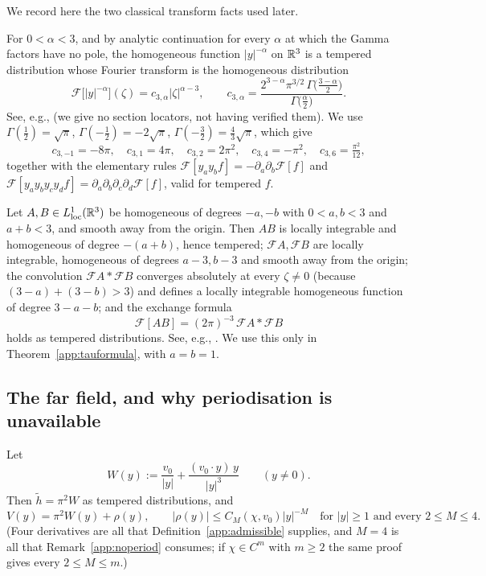 We record here the two classical transform facts used later.

\begin{remark}
\label{app:classical-riesz}
For $0<\alpha<3$, and by analytic continuation for every $\alpha$ at
which the Gamma factors have no pole, the homogeneous function
$|y|^{-\alpha}$ on $\mathbb R^3$ is a tempered distribution whose Fourier
transform is the homogeneous distribution
\[
\mathcal F\big[|y|^{-\alpha}\big](\zeta)=c_{3,\alpha}|\zeta|^{\alpha-3},
\qquad
c_{3,\alpha}=\frac{2^{3-\alpha}\pi^{3/2}\,\Gamma\!\big(\frac{3-\alpha}{2}\big)}
{\Gamma\!\big(\frac{\alpha}{2}\big)} .
\]
See, e.g., \cite{SteinWeiss,GelfandShilov,Grafakos} (we give no section
locators, not having verified them). We use
$\Gamma(\tfrac12)=\sqrt\pi$, $\Gamma(-\tfrac12)=-2\sqrt\pi$,
$\Gamma(-\tfrac32)=\tfrac43\sqrt\pi$, which give
\[
c_{3,-1}=-8\pi,\quad c_{3,1}=4\pi,\quad c_{3,2}=2\pi^2,\quad
c_{3,4}=-\pi^2,\quad c_{3,6}=\tfrac{\pi^2}{12},
\]
together with the elementary rules
$\mathcal F[y_ay_bf]=-\partial_a\partial_b\mathcal F[f]$ and
$\mathcal F[y_ay_by_cy_df]=\partial_a\partial_b\partial_c\partial_d\mathcal F[f]$,
valid for tempered $f$.
\end{remark}

\begin{remark}\label{app:classical-homog}
Let $A,B\in L^1_{\rm loc}(\mathbb R^3)$ be homogeneous of degrees $-a,-b$ with
$0<a,b<3$ and $a+b<3$, and smooth away from the origin. Then $AB$ is
locally integrable and homogeneous of degree $-(a+b)$, hence tempered;
$\mathcal FA,\mathcal FB$ are locally integrable, homogeneous of degrees
$a-3,b-3$ and smooth away from the origin; the convolution
$\mathcal FA*\mathcal FB$ converges absolutely at every $\zeta\neq0$
(because $(3-a)+(3-b)>3$) and defines a locally integrable homogeneous
function of degree $3-a-b$; and the exchange formula
\[
\mathcal F[AB]=(2\pi)^{-3}\,\mathcal FA*\mathcal FB
\]
holds as tempered distributions. See, e.g.,
\cite{GelfandShilov,Grafakos}. We use this only in
Theorem~\ref{app:tauformula}, with $a=b=1$.
\end{remark}

\subsection{The far field, and why periodisation is unavailable}
\label{app:farfield-sec}

\begin{theorem}\label{app:farfield}
Let
\[
W(y):=\frac{v_0}{|y|}+\frac{(v_0\cdot y)\,y}{|y|^3}\qquad(y\neq0).
\]
Then $\widetilde h=\pi^2W$ as tempered distributions, and
\[
V(y)=\pi^2W(y)+\rho(y),\qquad
|\rho(y)|\le C_M(\chi,v_0)|y|^{-M}\quad\text{for }|y|\ge1
\text{ and every }2\le M\le4 .
\]
(Four derivatives are all that Definition~\ref{app:admissible}
supplies, and $M=4$ is all that Remark~\ref{app:noperiod} consumes; if
$\chi\in C^m$ with $m\ge2$ the same proof gives every
$2\le M\le m$.)
\end{theorem}

